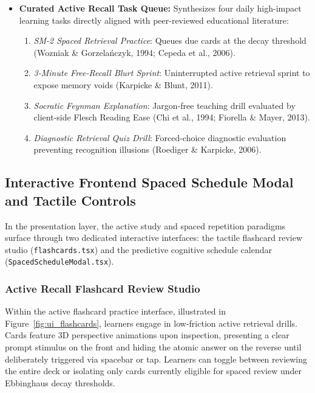 \documentclass[12pt,a4paper,oneside]{report}
\begin{document}
\begin{enumerate}
\begin{itemize}
        \item \textbf{Curated Active Recall Task Queue:} Synthesizes four daily high-impact learning tasks directly aligned with peer-reviewed educational literature:
        \begin{enumerate}
            \item \emph{SM-2 Spaced Retrieval Practice}: Queues due cards at the decay threshold (Wozniak \& Gorzela\'{n}czyk, 1994; Cepeda et al., 2006).
            \item \emph{3-Minute Free-Recall Blurt Sprint}: Uninterrupted active retrieval sprint to expose memory voids (Karpicke \& Blunt, 2011).
            \item \emph{Socratic Feynman Explanation}: Jargon-free teaching drill evaluated by client-side Flesch Reading Ease (Chi et al., 1994; Fiorella \& Mayer, 2013).
            \item \emph{Diagnostic Retrieval Quiz Drill}: Forced-choice diagnostic evaluation preventing recognition illusions (Roediger \& Karpicke, 2006).
        \end{enumerate}
    \end{itemize}
\end{enumerate}

\subsection{Interactive Frontend Spaced Schedule Modal and Tactile Controls}
In the presentation layer, the active study and spaced repetition paradigms surface through two dedicated interactive interfaces: the tactile flashcard review studio (\texttt{flashcards.tsx}) and the predictive cognitive schedule calendar (\texttt{SpacedScheduleModal.tsx}).

\subsubsection{Active Recall Flashcard Review Studio}
Within the active flashcard practice interface, illustrated in Figure~\ref{fig:ui_flashcards}, learners engage in low-friction active retrieval drills. Cards feature 3D perspective animations upon inspection, presenting a clear prompt stimulus on the front and hiding the atomic answer on the reverse until deliberately triggered via spacebar or tap. Learners can toggle between reviewing the entire deck or isolating only cards currently eligible for spaced review under Ebbinghaus decay thresholds.
\end{document}
